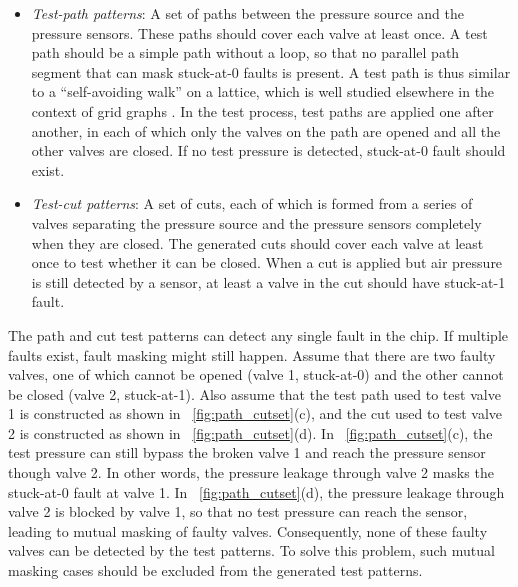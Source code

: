 \begin{itemize} 
 
  \item\textit{Test-path patterns}: A set of paths between the pressure source
    and the pressure sensors. These paths should cover each valve at least once. 
    A test path should be a simple
path without a loop, so that no parallel path segment
that can mask stuck-at-0 faults is present. A test path is thus
similar to a ``self-avoiding walk'' on a lattice, which is well studied
elsewhere in the context of grid graphs \cite{walk1996}.
    In the test
    process, test paths are applied one after another, in each of which only
    the valves on the path are opened and all the other valves are closed.
    If no test pressure is detected, 
    stuck-at-0 fault should exist.
 
\item\textit{Test-cut patterns}:  A set of cuts, each of which is formed from a
  series of valves 
  separating the pressure source and the pressure sensors 
  completely when they are closed. The generated cuts should cover each valve at least once to test
  whether it can be closed. When a cut is applied but air pressure is still
  detected by a sensor, at least a valve in the cut should have stuck-at-1 fault. 
\end{itemize}

The path and cut test patterns can detect any single fault in the chip. 
If multiple faults exist, fault masking might still happen.
Assume that there are two faulty valves, one of which cannot be opened (valve
1, stuck-at-0) and the other cannot be closed (valve 2, stuck-at-1).  Also
assume that the test path used to test valve 1 is constructed as shown in  
\figname~\ref{fig:path_cutset}(c), and  the cut used to test valve 2 is
constructed as shown  in \figname~\ref{fig:path_cutset}(d). In 
\figname~\ref{fig:path_cutset}(c), the test pressure can still bypass the
broken valve 1 and reach the pressure sensor though valve 2. In other words,
the pressure leakage through valve 2 masks the stuck-at-0 fault at valve 1. 
In \figname~\ref{fig:path_cutset}(d), the
pressure leakage through valve 2 is blocked by valve 1, 
so that no test pressure can reach the sensor,
leading to mutual masking of faulty valves.
Consequently, none of these faulty valves can be detected by the test patterns. 
To solve this problem, such mutual masking
cases should be excluded from the generated test patterns. 

